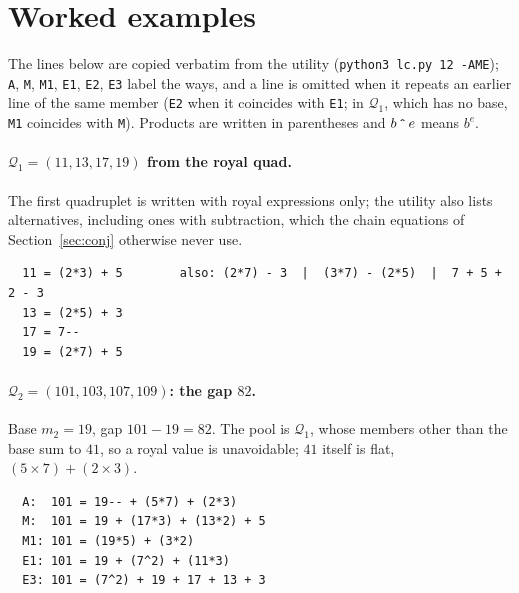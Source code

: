 \documentclass[11pt,a4paper]{article}
\newcommand{\Q}{\mathcal{Q}}
\newcommand{\code}[1]{\texttt{#1}}
\begin{document}
\section{Worked examples}
\label{sec:examples}

The lines below are copied verbatim from the utility
(\code{python3 lc.py 12 -AME}); \code{A}, \code{M}, \code{M1}, \code{E1},
\code{E2}, \code{E3} label the ways, and a line is omitted when it repeats
an earlier line of the same member (\code{E2} when it coincides with
\code{E1}; in $\Q_1$, which has no base, \code{M1} coincides with
\code{M}). Products are written in parentheses and $b\,\code{\^{}}\,e$
means $b^e$.

\paragraph{$\Q_1=(11,13,17,19)$ from the royal quad.}
The first quadruplet is written with royal expressions only; the utility
also lists alternatives, including ones with subtraction, which the chain
equations of Section~\ref{sec:conj} otherwise never use.
\begin{small}\begin{verbatim}
  11 = (2*3) + 5        also: (2*7) - 3  |  (3*7) - (2*5)  |  7 + 5 + 2 - 3
  13 = (2*5) + 3
  17 = 7--
  19 = (2*7) + 5
\end{verbatim}\end{small}

\paragraph{$\Q_2=(101,103,107,109)$: the gap $82$.}
Base $m_2=19$, gap $101-19=82$. The pool is $\Q_1$, whose members other
than the base sum to $41$, so a royal value is unavoidable; $41$ itself is
flat, $(5\times7)+(2\times3)$.
\begin{small}\begin{verbatim}
  A:  101 = 19-- + (5*7) + (2*3)
  M:  101 = 19 + (17*3) + (13*2) + 5
  M1: 101 = (19*5) + (3*2)
  E1: 101 = 19 + (7^2) + (11*3)
  E3: 101 = (7^2) + 19 + 17 + 13 + 3
\end{verbatim}\end{small}
\end{document}
